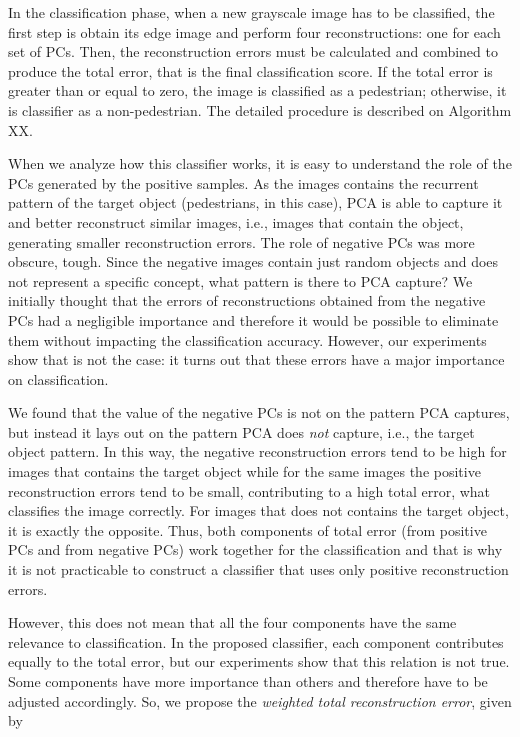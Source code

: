 \documentclass[10pt, conference, compsocconf]{IEEEtran}
\begin{document}
In the classification phase, when a new grayscale image has to be classified, the first step is obtain its edge image and perform four reconstructions: one for each set of PCs. Then, the reconstruction errors must be calculated and combined to produce the total error, that is the final classification score. If the total error is greater than or equal to zero, the image is classified as a pedestrian; otherwise, it is classifier as a non-pedestrian. The detailed procedure is described on Algorithm XX.


When we analyze how this classifier works, it is easy to understand the role of the PCs generated by the positive samples. As the images contains the recurrent pattern of the target object (pedestrians, in this case), PCA is able to capture it and better reconstruct similar images, i.e., images that contain the object, generating smaller reconstruction errors. The role of negative PCs was more obscure, tough. Since the negative images contain just random objects and does not represent a specific concept, what pattern is there to PCA capture? We initially thought that the errors of reconstructions obtained from the negative PCs had a negligible importance and therefore it would be possible to eliminate them without impacting the classification accuracy. However, our experiments show that is not the case: it turns out that these errors have a major importance on classification.

We found that the value of the negative PCs is not on the pattern PCA captures, but instead it lays out on the pattern PCA does \emph{not} capture, i.e., the target object pattern. In this way, the negative reconstruction errors tend to be high for images that contains the target object while for the same images the positive reconstruction errors tend to be small, contributing to a high total error, what classifies the image correctly. For images that does not contains the target object, it is exactly the opposite. Thus, both components of total error (from positive PCs and from negative PCs) work together for the classification and that is why it is not practicable to construct a classifier that uses only positive reconstruction errors.

However, this does not mean that all the four components have the same relevance to classification. In the proposed classifier, each component contributes equally to the total error, but our experiments show that this relation is not true. Some components have more importance than others and therefore have to be adjusted accordingly. So, we propose the \emph{weighted total reconstruction error}, given by
\end{document}

